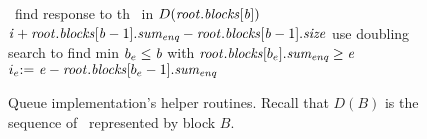 \begin{figure*}
\begin{algorithmic}[1]
 \com\ find response to th \dequeue\ in $D(\mbox{\textnormal{\textit{root}}}.\mbox{\textit{blocks}}[\mbox{\textnormal{\textit{b}}}])$
    \State {}
    \State {}\label{FRNum}
    \label{checkEmpty}
        \State \Return \nl \hfill {}\label{returnNull}
    \Else \ 
        \State {} \assign\ $\mbox{\textnormal{\textit{i}}} + \mbox{\textnormal{\textit{root}}}.\mbox{\textit{blocks}}[\mbox{\textnormal{\textit{b}}}-1].\mbox{\textit{sum\textsubscript{enq}}} - 
			\mbox{\textnormal{\textit{root}}}.\mbox{\textit{blocks}}[\mbox{\textnormal{\textit{b}}}-1].\mbox{\textit{size}}$ \label{computeE}
		\State use doubling search to find min $b_e\leq \mbox{\textnormal{\textit{b}}}$ with $\mbox{\textnormal{\textit{root}}}.\mbox{\textit{blocks}}[b_e].\mbox{\textit{sum\textsubscript{enq}}} \geq \mbox{\textnormal{\textit{e}}}$\label{FRb}
		\State $i_e \mbox{:=}\ \mbox{\textnormal{\textit{e}}} - \mbox{\textnormal{\textit{root}}}.\mbox{\textit{blocks}}[b_e-1].\mbox{\textit{sum\textsubscript{enq}}}$\label{FRi}
        \State \Return {}\label{findAnswer}
    \EndIf
{}
\end{algorithmic}
\caption{Queue implementation's helper routines. Recall that $D(B)$ is the sequence of \dequeues\ represented by block $B$.\label{code2}}
\end{figure*}

